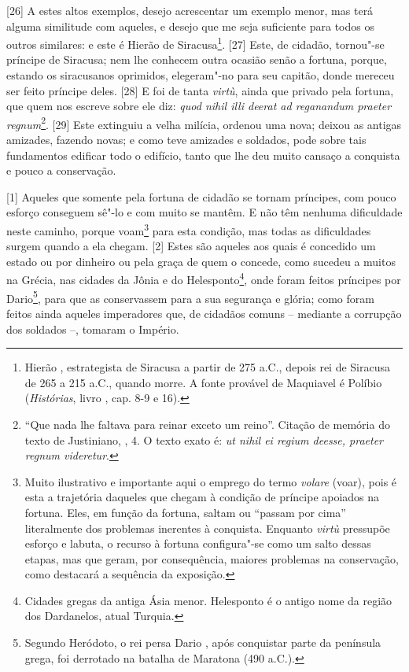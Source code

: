 {[}26{]} A estes altos exemplos, desejo acrescentar um exemplo menor,
mas terá alguma similitude com aqueles, e desejo que me seja suficiente
para todos os outros similares: e este é Hierão de Siracusa\footnote{Hierão , estrategista de Siracusa a partir de 275 a.C., depois rei de Siracusa de 265 a 215 a.C., quando morre. A fonte provável de Maquiavel é Políbio (\emph{Histórias}, livro , cap. 8-9 e 16).}. {[}27{]} Este, de cidadão, tornou"-se príncipe de
Siracusa; nem lhe conhecem outra ocasião senão a fortuna, porque,
estando os siracusanos oprimidos, elegeram"-no para seu capitão, donde
mereceu ser feito príncipe deles. {[}28{]} E foi de tanta \emph{virtù},
ainda que privado pela fortuna, que quem nos escreve sobre ele diz:
\emph{quod nihil illi deerat ad reganandum praeter regnum}\footnote{``Que
  nada lhe faltava para reinar exceto um reino''. Citação de memória do
  texto de Justiniano, , 4. O texto exato é: \emph{ut nihil ei
  regium deesse, praeter regnum videretur}.}. {[}29{]} Este extinguiu a
velha milícia, ordenou uma nova; deixou as antigas amizades, fazendo
novas; e como teve amizades e soldados, pode sobre tais fundamentos
edificar todo o edifício, tanto que lhe deu muito cansaço a conquista e
pouco a conservação.


{[}1{]} Aqueles que somente pela fortuna de cidadão se tornam príncipes,
com pouco esforço conseguem sê"-lo e com muito se mantêm. E não têm
nenhuma dificuldade neste caminho, porque voam\footnote{Muito
  ilustrativo e importante aqui o emprego do termo \emph{volare} (voar),
  pois é esta a trajetória daqueles que chegam à condição de príncipe
  apoiados na fortuna. Eles, em função da fortuna, saltam ou ``passam
  por cima'' literalmente dos problemas inerentes à conquista. Enquanto
  \emph{virtù} pressupõe esforço e labuta, o recurso à fortuna
  configura"-se como um salto dessas etapas, mas que geram, por
  consequência, maiores problemas na conservação, como destacará a
  sequência da exposição.} para esta condição, mas todas as dificuldades
surgem quando a ela chegam. {[}2{]} Estes são aqueles aos quais é
concedido um estado ou por dinheiro ou pela graça de quem o concede,
como sucedeu a muitos na Grécia, nas cidades da Jônia e do
Helesponto\footnote{Cidades gregas da antiga Ásia menor. Helesponto é o
  antigo nome da região dos Dardanelos, atual Turquia.}, onde foram feitos príncipes por Dario\footnote{Segundo
  Heródoto, o rei persa Dario , após conquistar parte da península
  grega, foi derrotado na batalha de Maratona (490 a.C.).}, para que as
conservassem para a sua segurança e glória; como foram feitos ainda
aqueles imperadores que, de cidadãos comuns -- mediante a corrupção dos
soldados --, tomaram o Império.


